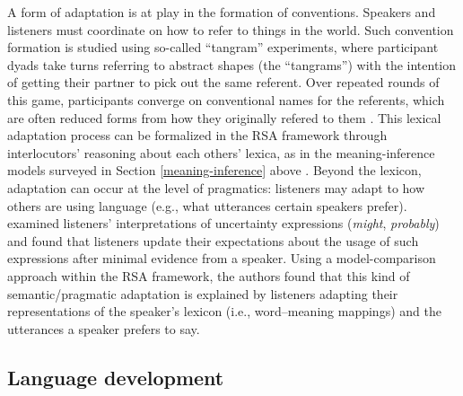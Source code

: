 \documentclass[10pt,letterpaper]{article}
\begin{document}
A form of adaptation is at play in the formation of conventions. 
Speakers and listeners must coordinate on how to refer to things in the world.
Such convention formation is studied using so-called ``tangram'' experiments, where participant dyads take turns referring to abstract shapes (the ``tangrams'') with the intention of getting their partner to pick out the same referent. 
Over repeated rounds of this game, participants converge on conventional names for the referents, which are often reduced forms from how they originally refered to them \cite{clark1986referring, hawkins2020characterizing}.
This  lexical adaptation process can be formalized in the RSA framework through interlocutors' reasoning about each others' lexica, as in the meaning-inference models surveyed in Section \ref{meaning-inference} above \cite{hawkins2017convention}.
Beyond the lexicon, adaptation can occur at the level of pragmatics: listeners may adapt to how others are using language (e.g., what utterances certain speakers prefer). 
\cite{schuster2020know} examined listeners' interpretations of uncertainty expressions (\emph{might}, \emph{probably}) and found that listeners update their expectations about the usage of such expressions after minimal evidence from a speaker. 
Using a model-comparison approach within the RSA framework, the authors found that this kind of semantic/pragmatic adaptation is explained by listeners adapting their representations of the speaker's lexicon (i.e., word--meaning mappings) and the utterances a speaker prefers to say. 

\subsection*{Language development}
\end{document}

